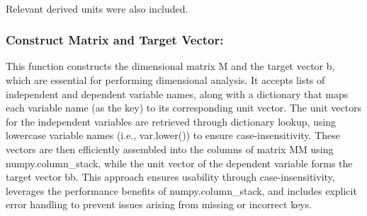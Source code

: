 \documentclass{article}
\begin{document}
\begin{table}[H]
\centering
{}
\caption{SI base and derived units with their corresponding vectorised representations.}
\label{tab:si_units_extended}
\end{table}\\





Relevant derived units were also included.\\

\subsubsection{Construct Matrix and Target Vector:}


This function constructs the dimensional matrix M and the target vector b, which are essential for performing dimensional analysis. It accepts lists of independent and dependent variable names, along with a dictionary that maps each variable name (as the key) to its corresponding unit vector. The unit vectors for the independent variables are retrieved through dictionary lookup, using lowercase variable names (i.e., var.lower()) to ensure case-insensitivity. These vectors are then efficiently assembled into the columns of matrix MM using numpy.column\_stack, while the unit vector of the dependent variable forms the target vector bb. This approach ensures usability through case-insensitivity, leverages the performance benefits of numpy.column\_stack, and includes explicit error handling to prevent issues arising from missing or incorrect keys.\\
\end{document}
